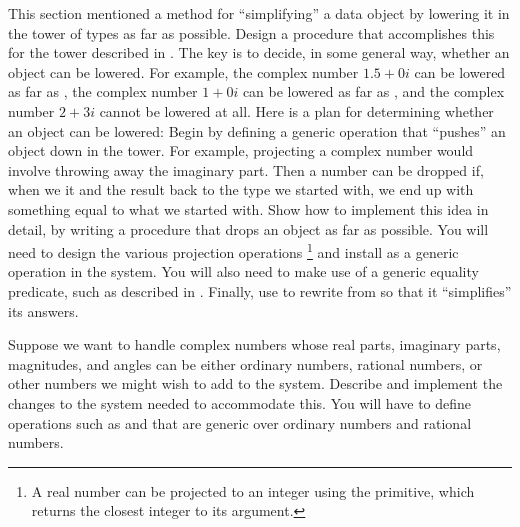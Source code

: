 \begin{exercise}
	\label{Exercise 2.85}
	This section mentioned a method for “simplifying” a data object by lowering it in the tower of types as far as possible.
	Design a procedure  that accomplishes this for the tower described in .
	The key is to decide, in some general way, whether an object can be lowered.
	For example, the complex number \( 1.5 + 0i \) can be lowered as far as , the complex number \( 1 + 0i \) can be lowered as far as , and the complex number \( 2 + 3i \) cannot be lowered at all.
	Here is a plan for determining whether an object can be lowered:
	Begin by defining a generic operation  that “pushes” an object down in the tower.
	For example, projecting a complex number would involve throwing away the imaginary part.
	Then a number can be dropped if, when we  it and  the result back to the type we started with, we end up with something equal to what we started with.
	Show how to implement this idea in detail, by writing a  procedure that drops an object as far as possible.
	You will need to design the various projection operations%
	\footnote{
		A real number can be projected to an integer using the  primitive, which returns the closest integer to its argument.
	}
	and install  as a generic operation in the system.
	You will also need to make use of a generic equality predicate, such as described in .
	Finally, use  to rewrite  from  so that it “simplifies” its answers.
\end{exercise}



\begin{exercise}
	\label{Exercise 2.86}
	Suppose we want to handle complex numbers whose real parts, imaginary parts, magnitudes, and angles can be either ordinary numbers, rational numbers, or other numbers we might wish to add to the system.
	Describe and implement the changes to the system needed to accommodate this.
	You will have to define operations such as  and  that are generic over ordinary numbers and rational numbers.
\end{exercise}

